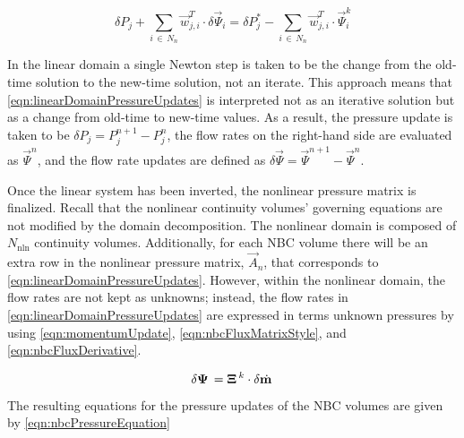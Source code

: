 \begin{equation}
\label{eqn:linearDomainPressureUpdates}
\delta P_{j} + \sum_{i\, \in \, N_{n}} \vec{w}^{T}_{j, i} \cdot \delta \vec{\Psi}_{i} = \delta P_{j}^{*} - \sum_{i\, \in \, N_{n}} \vec{w}^{T}_{j, i} \cdot{} \vec{\Psi}^{k}_{i}
\end{equation}

In the linear domain a single Newton step is taken to be the change from the old-time solution to the new-time solution, not an iterate.
This approach means that \eqref{eqn:linearDomainPressureUpdates} is interpreted not as an iterative solution but as a change from old-time to new-time values.
As a result, the pressure update is taken to be $\delta P_{j} = P_{j}^{n+1} - P_{j}^{n}$, the flow rates on the right-hand side are evaluated as $\vec{\Psi}^{n}$, and the flow rate updates are defined as $\delta \vec{\Psi} = \vec{\Psi}^{n+1} - \vec{\Psi}^{n}$.

Once the linear system has been inverted, the nonlinear pressure matrix is finalized.
Recall that the nonlinear continuity volumes' governing equations are not modified by the domain decomposition.
The nonlinear domain is composed of $N_{\text{nln}}$ continuity volumes.
Additionally, for each NBC volume there will be an extra row in the nonlinear pressure matrix, $\vec{A}_{n}$, that corresponds to \eqref{eqn:linearDomainPressureUpdates}.
However, within the nonlinear domain, the flow rates are not kept as unknowns; instead, the flow rates in \eqref{eqn:linearDomainPressureUpdates} are expressed in terms unknown pressures by using \eqref{eqn:momentumUpdate}, \eqref{eqn:nbcFluxMatrixStyle}, and \eqref{eqn:nbcFluxDerivative}.

\begin{equation}
\label{eqn:nbcFluxDerivative}
\delta \vec{\Psi} = \vec{\Xi}^{k} \cdot \delta \momVec{}
\end{equation}

The resulting equations for the pressure updates of the NBC volumes are given by \eqref{eqn:nbcPressureEquation} 

